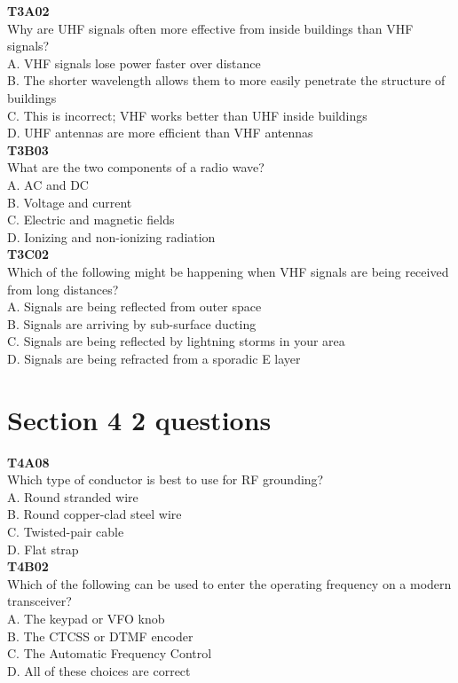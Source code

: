 \documentclass[12pt,letterpaper,twocolumn]{report}
\begin{document}
\textbf{T3A02}\\
Why are UHF signals often more effective from inside buildings than VHF signals?\\
A. VHF signals lose power faster over distance\\
B. The shorter wavelength allows them to more easily penetrate the structure of buildings\\
C. This is incorrect; VHF works better than UHF inside buildings\\
D. UHF antennas are more efficient than VHF antennas\\

\textbf{T3B03}\\
What are the two components of a radio wave?\\
A. AC and DC\\
B. Voltage and current\\
C. Electric and magnetic fields\\
D. Ionizing and non-ionizing radiation\\

\textbf{T3C02}\\
Which of the following might be happening when VHF signals are being received from long distances?\\
A. Signals are being reflected from outer space\\
B. Signals are arriving by sub-surface ducting\\
C. Signals are being reflected by lightning storms in your area\\
D. Signals are being refracted from a sporadic E layer\\

\section{Section 4 2 questions}

\textbf{T4A08}\\
Which type of conductor is best to use for RF grounding?\\
A. Round stranded wire \\
B. Round copper-clad steel wire\\
C. Twisted-pair cable\\
D. Flat strap\\

\textbf{T4B02}\\
Which of the following can be used to enter the operating frequency on a modern transceiver?\\
A. The keypad or VFO knob\\
B. The CTCSS or DTMF encoder\\
C. The Automatic Frequency Control\\
D. All of these choices are correct\\
\end{document}
